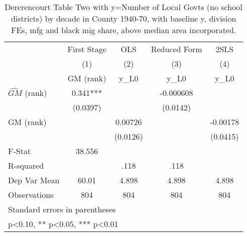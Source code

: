 \begin{table}[htbp]\centering
\def\sym#1{\ifmmode^{#1}\else\(^{#1}\)\fi}
\caption{Dererencourt Table Two with y=Number of Local Govts (no school districts) by decade in County 1940-70, with baseline y, division FEs, mfg and black mig share, above median area incorporated.}
\begin{tabular}{l*{4}{c}}
\toprule
                    & First Stage   &         OLS   &Reduced Form   &        2SLS   \\
                    &\multicolumn{1}{c}{(1)}&\multicolumn{1}{c}{(2)}&\multicolumn{1}{c}{(3)}&\multicolumn{1}{c}{(4)}\\
                    &\multicolumn{1}{c}{GM  (rank)}&\multicolumn{1}{c}{y\_L0}&\multicolumn{1}{c}{y\_L0}&\multicolumn{1}{c}{y\_L0}\\
\midrule
$\hat{GM}$ (rank)   &       0.341***&               &   -0.000608   &               \\
                    &    (0.0397)   &               &    (0.0142)   &               \\
\addlinespace
GM  (rank)          &               &     0.00726   &               &    -0.00178   \\
                    &               &    (0.0126)   &               &    (0.0415)   \\
\midrule
F-Stat              &      38.556   &               &               &               \\
R-squared           &               &        .118   &        .118   &               \\
Dep Var Mean        &       60.01   &       4.898   &       4.898   &       4.898   \\
Observations        &         804   &         804   &         804   &         804   \\
\bottomrule
\multicolumn{5}{l}{\footnotesize Standard errors in parentheses}\\
\multicolumn{5}{l}{\footnotesize * p<0.10, ** p<0.05, *** p<0.01}\\
\end{tabular}
\end{table}
